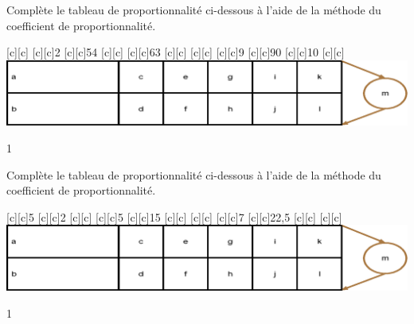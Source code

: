 \documentclass[a4paper,11pt]{report}
\begin{document}
\newpage
\begin{exop}
{Complète le tableau de proportionnalité ci-dessous à l'aide de la méthode du coefficient de proportionnalité.
 
	\vspace{-0.8cm}
\begin{center}
[c][c]{}
[c][c]{2}
[c][c]{54}
[c][c]{}
[c][c]{63}
[c][c]{}
[c][c]{}
[c][c]{9}
[c][c]{90}
[c][c]{10}
[c][c]{\Large\color{brown}{$\cdot \qquad$}}
\includegraphics[scale=.9]{media/fa-30/tableaucoeffn.eps}
\end{center}
\vspace{-0.5cm}}{1}
\end{exop}

\begin{exop}{
Complète le tableau de proportionnalité ci-dessous à l'aide de la méthode du coefficient de proportionnalité.
 
	\vspace{-0.8cm}
\begin{center}
[c][c]{5}
[c][c]{2}
[c][c]{}
[c][c]{5}
[c][c]{15}
[c][c]{}
[c][c]{}
[c][c]{7}
[c][c]{22,5}
[c][c]{}
[c][c]{\Large\color{brown}{$\cdot \qquad$}}
\includegraphics[scale=.9]{media/fa-30/tableaucoeffn.eps}
\end{center}
\vspace{-0.5cm}}{1}
\end{exop}
\end{document}
